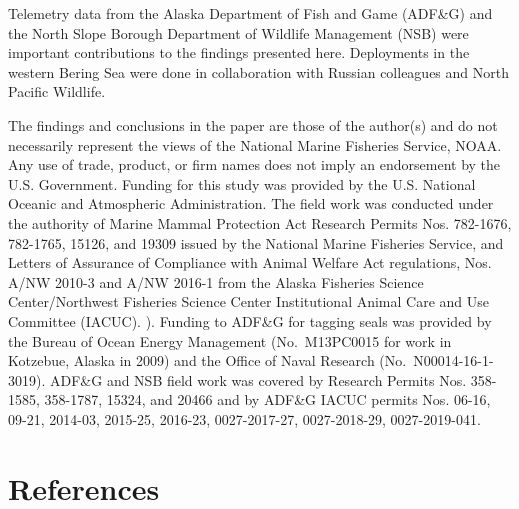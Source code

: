 \documentclass[fleqn,10pt,lineno]{wlpeerj} %
\begin{document}
Telemetry data from the Alaska Department of Fish and Game (ADF\&G) and the North
Slope Borough Department of Wildlife Management (NSB) were important
contributions to the findings presented here. Deployments in the western Bering
Sea were done in collaboration with Russian colleagues and North Pacific
Wildlife.

The findings and conclusions in the paper are those of the author(s) and do not
necessarily represent the views of the National Marine Fisheries Service, NOAA.
Any use of trade, product, or firm names does not imply an endorsement by the
U.S. Government. Funding for this study was provided by the U.S. National
Oceanic and Atmospheric Administration. The field work was conducted under the
authority of Marine Mammal Protection Act Research Permits Nos. 782-1676,
782-1765, 15126, and 19309 issued by the National Marine Fisheries Service, and
Letters of Assurance of Compliance with Animal Welfare Act regulations, Nos.
A/NW 2010-3 and A/NW 2016-1 from the Alaska Fisheries Science Center/Northwest
Fisheries Science Center Institutional Animal Care and Use Committee (IACUC). ).
Funding to ADF\&G for tagging seals was provided by the Bureau of Ocean Energy
Management (No.~M13PC0015 for work in Kotzebue, Alaska in 2009) and the Office
of Naval Research (No.~N00014-16-1-3019). ADF\&G and NSB field work was covered by
Research Permits Nos. 358-1585, 358-1787, 15324, and 20466 and by ADF\&G IACUC
permits Nos. 06-16, 09-21, 2014-03, 2015-25, 2016-23, 0027-2017-27,
0027-2018-29, 0027-2019-041.

\hypertarget{references}{%
\section*{References}\label{references}}
\end{document}
